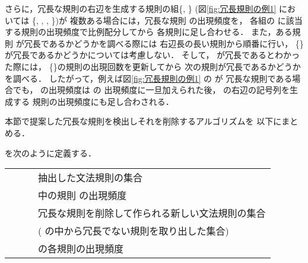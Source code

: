 さらに，冗長な規則の右辺を生成する規則の組\{, \}
(図\ref{fig:冗長規則の例1} においては
\{, , , \})が
複数ある場合には，冗長な規則 の出現頻度を，
各組の に該当する規則の出現頻度で比例配分してから
各規則に足し合わせる．
また，ある規則 が冗長であるかどうかを調べる際には
右辺長の長い規則から順番に行い，
\{\}が冗長であるかどうかについては考慮しない．
そして， が冗長であるとわかった際には，
\{\}の規則の出現回数を更新してから
次の規則が冗長であるかどうかを調べる．
したがって，例えば図\ref{fig:冗長規則の例1} の が
冗長な規則である場合でも， の出現頻度は の
出現頻度に一旦加えられた後， の右辺の記号列を生成する
規則の出現頻度にも足し合わされる．

本節で提案した冗長な規則を検出しそれを削除するアルゴリズムを
以下にまとめる．

\begin{flushleft}
  \vspace*{2mm}{\bf 【冗長規則削除アルゴリズム】}
  \vspace*{-3mm}
\end{flushleft}

 を次のように定義する．
\begin{center}
  \begin{tabular}{lcl}
              & ~~ &
      抽出した文法規則の集合 \\
           & ~~ &
       中の規則  の出現頻度 \\
        & ~~ &
      冗長な規則を削除して作られる新しい文法規則の集合 \\
    &&( の中から冗長でない規則を取り出した集合) \\
     & ~~ &
       の各規則の出現頻度 \\
  \end{tabular}
\end{center}


